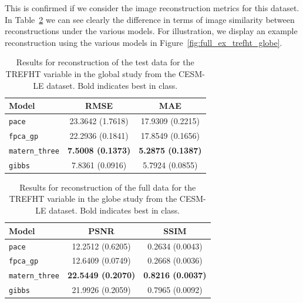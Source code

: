 This is confirmed if we consider the image reconstruction metrics for this dataset.
In Table~\ref{tab:full_cesm_trefht_globe} we can see clearly the difference in terms of image similarity between reconstructions under the various models. 
For illustration, we display an example reconstruction using the various models in Figure~\ref{fig:full_ex_trefht_globe}.

\begin{table}
	\caption[Results for TREFHT variable on test data in the Global study]{Results for reconstruction of the test data for the TREFHT variable in the global study from the CESM-LE dataset. Bold indicates best in class.}
	\centering
	\label{tab:test_cesm_trefht_globe}
	\begin{tabular}{lcc}
		\toprule
		\textbf{Model} & \textbf{RMSE} & \textbf{MAE} \\
		\midrule
		\verb*|pace| & 23.3642	(1.7618) & 17.9309 (0.2215) \\
		\verb*|fpca_gp| & 22.2936	(0.1841) & 17.8549 (0.1656) \\
		\verb*|matern_three| & \textbf{7.5008 (0.1373)}& \textbf{5.2875 (0.1387)}\\
		\verb*|gibbs| & 7.8361 (0.0916) & 5.7924 (0.0855)\\
		\bottomrule
	\end{tabular}
\end{table}

\begin{table}
	\caption[Results for TREFHT variable on full data in the Global study]{Results for reconstruction of the full data for the TREFHT variable in the globe study from the CESM-LE dataset. Bold indicates best in class.}
	\centering
	\label{tab:full_cesm_trefht_globe}
	\begin{tabular}{lcc}
		\toprule
		\textbf{Model} & \textbf{PSNR} & \textbf{SSIM} \\
		\midrule
		\verb*|pace| & 12.2512 (0.6205) & 0.2634	(0.0043) \\
		\verb*|fpca_gp| & 12.6409 (0.0749) & 0.2668 (0.0036) \\
		\verb*|matern_three| & \textbf{22.5449	(0.2070)} & \textbf{0.8216 (0.0037)}\\
		\verb*|gibbs| & 21.9926 (0.2059) & 0.7965	(0.0092)\\
		\bottomrule
	\end{tabular}
\end{table}

